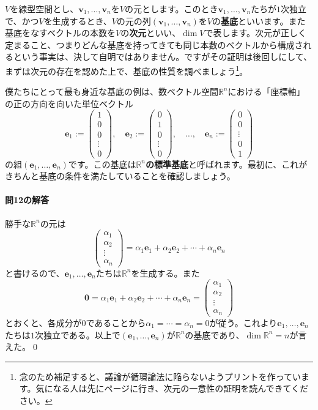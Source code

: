 $V$を線型空間とし、$\bm{v}_1, \ldots, \bm{v}_n$を$V$の元とします。このとき$\bm{v}_1,\ldots,\bm{v}_n$たちが$1$次独立で、かつ$V$を生成するとき、$V$の元の列$(\bm{v}_1,\ldots,\bm{v}_n)$を$V$の\textbf{基底}といいます。また基底をなすベクトルの本数を$V$の\textbf{次元}といい、$\dim V$で表します。次元が正しく定まること、つまりどんな基底を持ってきても同じ本数のベクトルから構成されるという事実は、決して自明ではありません。ですがその証明は後回しにして、まずは次元の存在を認めた上で、基底の性質を調べましょう\footnote{念のため補足すると、議論が循環論法に陥らないようプリントを作っています。気になる人は先に\pageref{subsec:uniqueness_of_dimension}ページに行き、次元の一意性の証明を読んできてください。}。

僕たちにとって最も身近な基底の例は、数ベクトル空間$\mathbb{R}^n$における「座標軸」の正の方向を向いた単位ベクトル
\[
\bm{e}_1 :=
\begin{pmatrix}
1 \\
0 \\
0 \\
\vdots \\
0
\end{pmatrix}, \quad
\bm{e}_2 :=
\begin{pmatrix}
0 \\
1 \\
0 \\
\vdots \\
0
\end{pmatrix}, \quad \ldots, \quad
\bm{e}_n :=
\begin{pmatrix}
0 \\
0 \\
\vdots \\
0 \\
1
\end{pmatrix}
\]
の組$(\bm{e}_1, \ldots, \bm{e}_n)$です。この基底は\textbf{$\mathbb{R}^n$の標準基底}と呼ばれます。最初に、これがきちんと基底の条件を満たしていることを確認しましょう。

\paragraph{問12の解答} 勝手な$\mathbb{R}^n$の元は
\[
\begin{pmatrix}
\alpha_1 \\
\alpha_2 \\
\vdots \\
\alpha_n
\end{pmatrix}
=
\alpha_1 \bm{e}_1 + \alpha_2 \bm{e}_2 + \cdots + \alpha_n \bm{e}_n
\]
と書けるので、$\bm{e}_1,\ldots,\bm{e}_n$たちは$\mathbb{R}^n$を生成する。また
\[
\bm{0} = \alpha_1 \bm{e}_1 + \alpha_2 \bm{e}_2 + \cdots + \alpha_n \bm{e}_n
=
\begin{pmatrix}
\alpha_1 \\
\alpha_2 \\
\vdots \\
\alpha_n
\end{pmatrix}
\]
とおくと、各成分が$0$であることから$\alpha_1 = \cdots = \alpha_n = 0$が従う。これより$\bm{e}_1,\ldots,\bm{e}_n$たちは$1$次独立である。以上で$(\bm{e}_1,\ldots,\bm{e}_n)$が$\mathbb{R}^n$の基底であり、$\dim \mathbb{R}^n = n$が言えた。\qed

